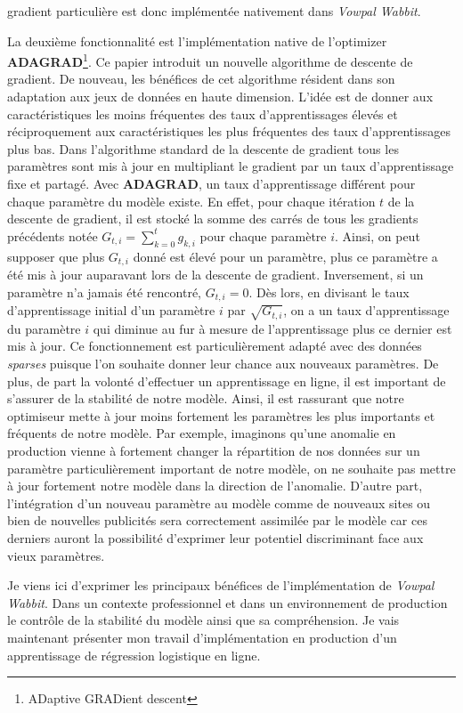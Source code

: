 gradient particulière est donc implémentée nativement dans \emph{Vowpal Wabbit}. \par
        La deuxième fonctionnalité est l'implémentation native de l'optimizer \textbf{ADAGRAD}\footnote{ADaptive GRADient descent}\cite{duchi2011adaptive}. Ce papier introduit un nouvelle algorithme de descente de gradient. De nouveau, les bénéfices de cet algorithme résident dans son adaptation aux jeux de données en haute dimension. L'idée est de donner aux caractéristiques les moins fréquentes des taux d'apprentissages élevés et réciproquement aux caractéristiques les plus fréquentes des taux d'apprentissages plus bas. Dans l'algorithme standard de la descente de gradient tous les paramètres sont mis à jour en multipliant le gradient par un taux d'apprentissage fixe et partagé. Avec \textbf{ADAGRAD}, un taux d'apprentissage différent pour chaque paramètre du modèle existe. En effet, pour chaque itération $t$ de la descente de gradient, il est stocké la somme des carrés de tous les gradients précédents notée $G_{t, i} = \sum_{k = 0}^{t} g_{k, i}$ pour chaque paramètre $i$. Ainsi, on peut supposer que plus  $G_{t, i}$ donné est élevé pour un paramètre, plus ce paramètre a été mis à jour auparavant lors de la descente de gradient. Inversement, si un paramètre n'a jamais été rencontré,  $G_{t, i} = 0$. Dès lors, en divisant le taux d'apprentissage initial d'un paramètre $i$ par $\sqrt{G_{t, i}}$, on a un taux d'apprentissage du paramètre $i$ qui diminue au fur à mesure de l'apprentissage plus ce dernier est mis à jour. Ce fonctionnement est particulièrement adapté avec des données \emph{sparses} puisque l'on souhaite donner leur \fg chance \og aux nouveaux paramètres. De plus, de part la volonté d'effectuer un apprentissage en ligne, il est important de s'assurer de la stabilité de notre modèle. Ainsi, il est rassurant que notre optimiseur mette à jour moins fortement les paramètres les plus importants et fréquents de notre modèle. Par exemple, imaginons qu'une anomalie en production vienne à fortement changer la répartition de nos données sur un paramètre particulièrement important de notre modèle, on ne souhaite pas mettre à jour fortement notre modèle dans la direction de l'anomalie. D'autre part, l'intégration d'un nouveau paramètre au modèle comme de nouveaux sites ou bien de nouvelles publicités sera correctement assimilée par le modèle car ces derniers auront la possibilité d'exprimer leur potentiel discriminant face aux \fg vieux \og paramètres. \par
        Je viens ici d'exprimer les principaux bénéfices de l'implémentation de \emph{Vowpal Wabbit}. Dans un contexte professionnel et dans un environnement de production le contrôle de la stabilité du modèle ainsi que sa compréhension. Je vais maintenant présenter mon travail d'implémentation en production d'un apprentissage de régression logistique en ligne.
